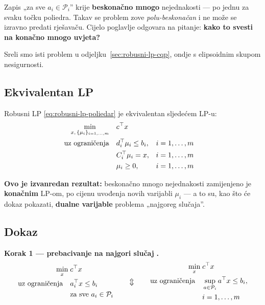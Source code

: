 \begin{napomena}
Zapis „za sve $a_i \in \mathcal{P}_i$” krije \textbf{beskonačno mnogo}
nejednakosti --- po jednu za svaku točku poliedra. Takav se problem zove
\emph{polu-beskonačan} i ne može se izravno predati rješavaču. Cijelo poglavlje
odgovara na pitanje: \textbf{kako to svesti na konačno mnogo uvjeta?}

Sreli smo isti problem u odjeljku~\ref{sec:robusni-lp-cqp}, ondje s elipsoidnim
skupom nesigurnosti.
\end{napomena}

\subsection{Ekvivalentan LP}

\begin{teorem}
Robusni LP \eqref{eq:robusni-lp-poliedar} je ekvivalentan sljedećem LP-u:
\begin{equation}
\label{eq:robusni-lp-ekv}
\begin{aligned}
\min_{x,\,\{\mu_i\}_{i=1,\dots,m}} \quad & c\T x \\
\uzogr & d_i\T\mu_i \le b_i, && i = 1,\dots,m \\
       & C_i\T\mu_i = x, && i = 1,\dots,m \\
       & \mu_i \ge 0, && i = 1,\dots,m
\end{aligned}
\end{equation}
\end{teorem}

\textbf{Ovo je izvanredan rezultat:} beskonačno mnogo nejednakosti zamijenjeno
je \textbf{konačnim} LP-om, po cijenu uvođenja novih varijabli $\mu_i$ --- a to
su, kao što će dokaz pokazati, \textbf{dualne varijable} problema „najgoreg
slučaja”.

\subsection{Dokaz}

\textbf{Korak 1 --- prebacivanje na najgori slučaj} \textbf{.}
\[
\begin{aligned}
\min_x \; & c\T x \\
\uzogr & a_i\T x \le b_i \\
& \text{za sve } a_i \in \mathcal{P}_i
\end{aligned}
\qquad\Updownarrow\qquad
\begin{aligned}
\min_x \; & c\T x \\
\uzogr & \sup_{a\in\mathcal{P}_i} a\T x \le b_i, \\
& i = 1,\dots,m
\end{aligned}
\]

